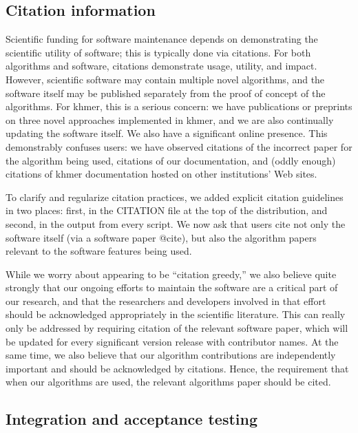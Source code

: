 \documentclass[11pt]{article}
\begin{document}


\subsection{Citation information}

Scientific funding for software maintenance depends on demonstrating
the scientific utility of software; this is typically done via
citations.  For both algorithms and software, citations demonstrate
usage, utility, and impact.  However, scientific software may contain
multiple novel algorithms, and the software itself may be published
separately from the proof of concept of the algorithms.  For khmer,
this is a serious concern: we have publications or preprints on three
novel approaches implemented in khmer, and we are also continually
updating the software itself.  We also have a significant online
presence. This demonstrably confuses users: we have observed citations
of the incorrect paper for the algorithm being used, citations of our
documentation, and (oddly enough) citations of khmer documentation
hosted on other institutions' Web sites.

To clarify and regularize citation practices, we added explicit
citation guidelines in two places: first, in the CITATION file at the
top of the distribution, and second, in the output from every script.
We now ask that users cite not only the software itself (via a
software paper @cite), but also the algorithm papers relevant to the
software features being used.

While we worry about appearing to be ``citation greedy,'' we also
believe quite strongly that our ongoing efforts to maintain the
software are a critical part of our research, and that the researchers
and developers involved in that effort should be acknowledged
appropriately in the scientific literature.  This can really only be
addressed by requiring citation of the relevant software paper, which
will be updated for every significant version release with contributor
names.  At the same time, we also believe that our algorithm
contributions are independently important and should be acknowledged
by citations.  Hence, the requirement that when our algorithms are
used, the relevant algorithms paper should be cited.

\subsection{Integration and acceptance testing}
\end{document}
